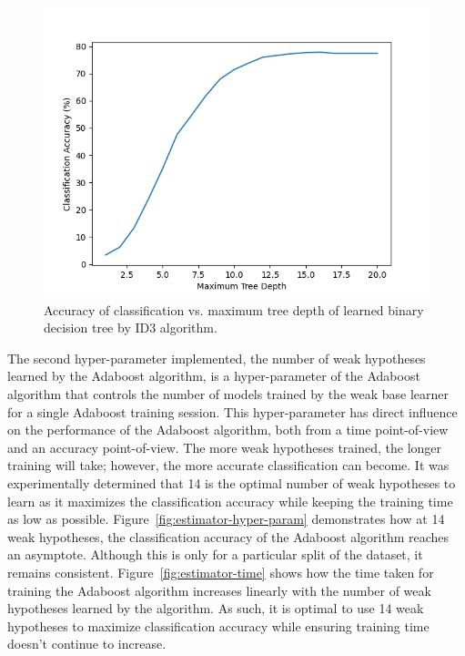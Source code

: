\documentclass[a4paper]{article}
\begin{document}
\begin{figure}[h!]
    \centering
    \includegraphics[scale=0.7]{images/tree-depth-plot.png}
    \caption{Accuracy of classification vs. maximum tree depth of learned binary decision tree by ID3 algorithm.}
    \label{fig:depth-hyper-param}
\end{figure}

The second hyper-parameter implemented, the number of weak hypotheses learned by the Adaboost algorithm, is a hyper-parameter of the Adaboost algorithm that controls the number of models trained by the weak base learner for a single Adaboost training session. This hyper-parameter has direct influence on the performance of the Adaboost algorithm, both from a time point-of-view and an accuracy point-of-view. The more weak hypotheses trained, the longer training will take; however, the more accurate classification can become. It was experimentally determined that 14 is the optimal number of weak hypotheses to learn as it maximizes the classification accuracy while keeping the training time as low as possible. Figure~\ref{fig:estimator-hyper-param} demonstrates how at 14 weak hypotheses, the classification accuracy of the Adaboost algorithm reaches an asymptote. Although this is only for a particular split of the dataset, it remains consistent. Figure~\ref{fig:estimator-time} shows how the time taken for training the Adaboost algorithm increases linearly with the number of weak hypotheses learned by the algorithm. As such, it is optimal to use 14 weak hypotheses to maximize classification accuracy while ensuring training time doesn't continue to increase.
\end{document}
